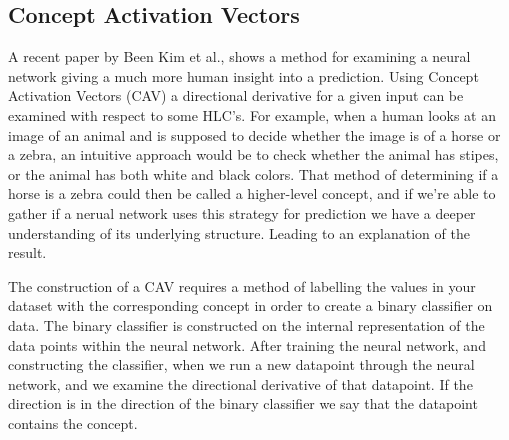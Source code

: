 \subsection{Concept Activation Vectors}

A recent paper by Been Kim et al.\cite{Keem:TCAV}, shows a method for examining
a neural network giving a much more human insight into a prediction. Using Concept
Activation Vectors (CAV) a directional derivative for a given input can be examined
with respect to some HLC's. For example, when a human looks at an image of an animal
and is supposed to decide whether the image is of a horse or a zebra, an intuitive
approach would be to check whether the animal has stipes, or the animal has both white and black colors.
That method of determining if a horse is a zebra could then be called a higher-level
concept, and if we're able to gather if a nerual network uses this strategy for prediction
we have a deeper understanding of its underlying structure. Leading to an explanation of
the result.

The construction of a CAV requires a method of labelling the values in your dataset with
the corresponding concept in order to create a binary classifier on data. The binary classifier is constructed on the internal representation of the data points within the neural network. After training the neural network, and constructing the classifier, when we run a new datapoint through the neural network, and we examine the directional derivative of that datapoint. If the direction is in the direction of the binary classifier we say that the datapoint contains the concept.